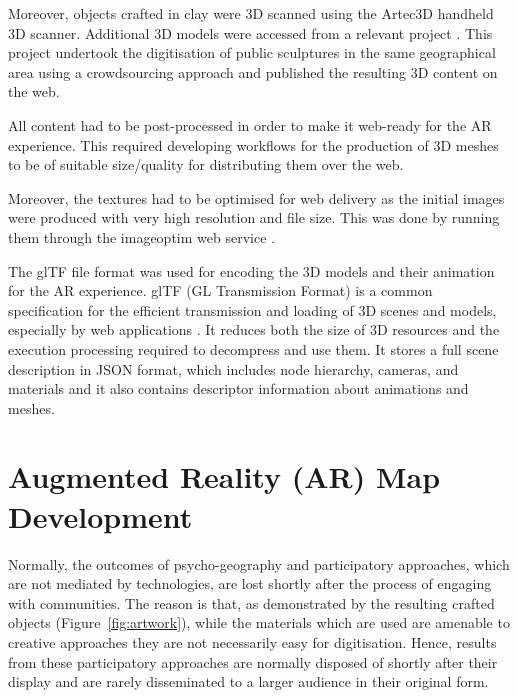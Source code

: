 \documentclass[acmlarge,screen,dvipsnames]{acmart}
\begin{document}
Moreover, objects crafted in clay were 3D scanned using the Artec3D handheld
3D scanner. Additional 3D models were accessed from a relevant project
\cite{14f05b94a1844f5e850c87fc9d042c59}. This project undertook the
digitisation of public sculptures in the same geographical area using a
crowdsourcing approach and published the resulting 3D content on the web.

All content had to be post-processed in order to make it web-ready for the AR
experience. This required developing workflows for the production of 3D meshes
to be of suitable size/quality for distributing them over the web. 

Moreover, the textures had to be optimised for web delivery as the initial images were
produced with very high resolution and file size. This was done by running
them through the imageoptim web service \cite{ImageOptim}.  

The glTF file format was used for encoding the 3D models and their animation
for the AR experience. glTF (GL Transmission Format) is a common specification
for the efficient transmission and loading of 3D scenes and models, especially
by web applications \cite{khronos}. It reduces both the size of 3D resources
and the execution processing required to decompress and use them. It stores a
full scene description in JSON format, which includes node hierarchy, cameras,
and materials and it also contains descriptor information about animations and
meshes.


\section{Augmented Reality (AR) Map Development} \label{tech} Normally, the
outcomes of psycho-geography and participatory approaches, which are not
mediated by technologies, are lost shortly after the process of engaging with
communities. The reason is that, as demonstrated by the resulting crafted
objects (Figure~\ref{fig:artwork}), while the materials which are used  are
amenable to creative approaches they are not necessarily easy for
digitisation. Hence, results from these participatory approaches are normally
disposed of shortly after their display and are rarely disseminated to
 a larger audience in their original form. 
\end{document}
